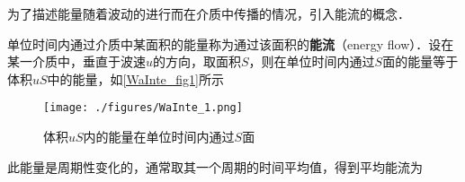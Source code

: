 

为了描述能量随着波动的进行而在介质中传播的情况，引入能流的概念．

单位时间内通过介质中某面积的能量称为通过该面积的\textbf{能流}（energy flow）．设在某一介质中，垂直于波速$u$的方向，取面积$S$，则在单位时间内通过$S$面的能量等于体积$uS$中的能量，如\autoref{WaInte_fig1}所示
\begin{figure}[ht]
\centering
\texttt{[image: ./figures/WaInte\_1.png]}
\caption{体积$uS$内的能量在单位时间内通过$S$面} \label{WaInte_fig1}
\end{figure}

此能量是周期性变化的，通常取其一个周期的时间平均值，得到平均能流为
